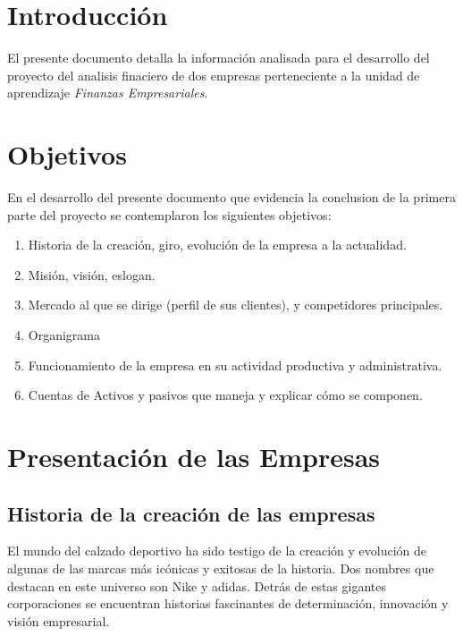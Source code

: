 \documentclass[a4paper,12pt]{article}
\begin{document}
\newpage


\section{Introducción}

El presente documento detalla la información analisada para el desarrollo del proyecto del analisis finaciero de dos empresas perteneciente a la unidad de aprendizaje \emph{Finanzas Empresariales}.

\section{Objetivos}
En el desarrollo del presente documento que evidencia la conclusion de la primera parte del proyecto se contemplaron los siguientes objetivos:

\begin{enumerate}
	\item Historia de la creación, giro, evolución de la empresa a la actualidad.
	\item Misión, visión, eslogan.
	\item Mercado al que se dirige (perfil de sus clientes), y competidores principales.
	\item Organigrama
	\item Funcionamiento de la empresa en su actividad productiva y administrativa.
	\item Cuentas de Activos y pasivos que maneja y explicar cómo se componen.
\end{enumerate}

\clearpage

\section{Presentación de las Empresas}

\subsection{Historia de la creación de las empresas}

El mundo del calzado deportivo ha sido testigo de la creación y evolución de algunas de las marcas más icónicas y exitosas de la historia. Dos nombres que destacan en este universo son Nike y adidas. Detrás de estas gigantes corporaciones se encuentran historias fascinantes de determinación, innovación y visión empresarial.\par
\end{document}
